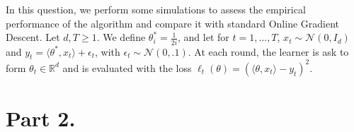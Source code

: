 \documentclass[11pt]{exam}
\newcommand{\R}{\mathbb{R}}
\newcommand{\cN}{\mathcal{N}}
\begin{document}
\begin{questions}
	\question In this question, we perform some simulations to assess the empirical performance of the algorithm and compare it with standard Online Gradient Descent. Let $d,T \geq 1$. We define $\theta^*_i = \frac{1}{2i}$, and  let for $t=1,\dots, T$, $x_t \sim \cN(0,I_d)$ and $y_t = \langle \theta^*, x_t \rangle + \epsilon_t$, with $\epsilon_t \sim \cN(0,.1)$. At each round, the learner is ask to form $\theta_t \in \R^d$ and is evaluated with the loss $\ell_t(\theta) = (\langle\theta,x_t\rangle - y_t)^2$. 


\end{questions}

\section*{Part 2. }

\end{document}
